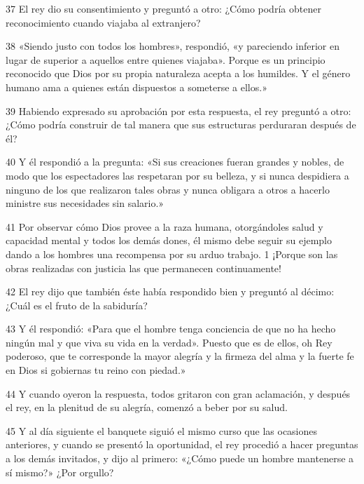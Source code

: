 \par 37 El rey dio su consentimiento y preguntó a otro: ¿Cómo podría obtener reconocimiento cuando viajaba al extranjero?

\par 38 «Siendo justo con todos los hombres», respondió, «y pareciendo inferior en lugar de superior a aquellos entre quienes viajaba». Porque es un principio reconocido que Dios por su propia naturaleza acepta a los humildes. Y el género humano ama a quienes están dispuestos a someterse a ellos.»

\par 39 Habiendo expresado su aprobación por esta respuesta, el rey preguntó a otro: ¿Cómo podría construir de tal manera que sus estructuras perduraran después de él?

\par 40 Y él respondió a la pregunta: «Si sus creaciones fueran grandes y nobles, de modo que los espectadores las respetaran por su belleza, y si nunca despidiera a ninguno de los que realizaron tales obras y nunca obligara a otros a hacerlo ministre sus necesidades sin salario.»

\par 41 Por observar cómo Dios provee a la raza humana, otorgándoles salud y capacidad mental y todos los demás dones, él mismo debe seguir su ejemplo dando a los hombres una recompensa por su arduo trabajo. 1 ¡Porque son las obras realizadas con justicia las que permanecen continuamente!

\par 42 El rey dijo que también éste había respondido bien y preguntó al décimo: ¿Cuál es el fruto de la sabiduría?

\par 43 Y él respondió: «Para que el hombre tenga conciencia de que no ha hecho ningún mal y que viva su vida en la verdad». Puesto que es de ellos, oh Rey poderoso, que te corresponde la mayor alegría y la firmeza del alma y la fuerte fe en Dios si gobiernas tu reino con piedad.»

\par 44 Y cuando oyeron la respuesta, todos gritaron con gran aclamación, y después el rey, en la plenitud de su alegría, comenzó a beber por su salud.

\par 45 Y al día siguiente el banquete siguió el mismo curso que las ocasiones anteriores, y cuando se presentó la oportunidad, el rey procedió a hacer preguntas a los demás invitados, y dijo al primero: «¿Cómo puede un hombre mantenerse a sí mismo?» ¿Por orgullo?

